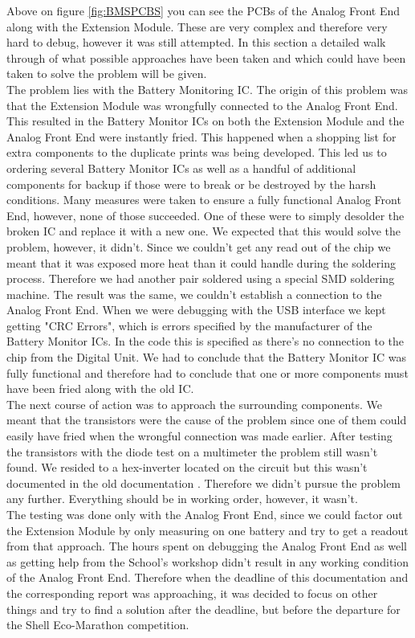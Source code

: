 Above on figure \vref{fig:BMSPCBS} you can see the PCBs of the Analog Front End along with the Extension Module. These are very complex and therefore very hard to debug, however it was still attempted. In this section a detailed walk through of what possible approaches have been taken and which could have been taken to solve the problem will be given. \\
The problem lies with the Battery Monitoring IC. The origin of this problem was that the Extension Module was wrongfully connected to the Analog Front End. This resulted in the Battery Monitor ICs on both the Extension Module and the Analog Front End were instantly fried. This happened when a shopping list for extra components to the duplicate prints was being developed. This led us to ordering several Battery Monitor ICs as well as a handful of additional components for backup if those were to break or be destroyed by the harsh conditions. Many measures were taken to ensure a fully functional Analog Front End, however, none of those succeeded. One of these were to simply desolder the broken IC and replace it with a new one. We expected that this would solve the problem, however, it didn't. Since we couldn't get any read out of the chip we meant that it was exposed more heat than it could handle during the soldering process. Therefore we had another pair soldered using a special SMD soldering machine. The result was the same, we couldn't establish a connection to the Analog Front End. When we were debugging with the USB interface we kept getting "CRC Errors", which is errors specified by the manufacturer of the Battery Monitor ICs. In the code this is specified as there's no connection to the chip from the Digital Unit. We had to conclude that the Battery Monitor IC was fully functional and therefore had to conclude that one or more components must have been fried along with the old IC. \\
The next course of action was to approach the surrounding components. We meant that the transistors were the cause of the problem since one of them could easily have fried when the wrongful connection was made earlier. After testing the transistors with the diode test on a multimeter the problem still wasn't found. We resided to a hex-inverter located on the circuit but this wasn't documented in the old documentation \cite{BMSDocumentation}. Therefore we didn't pursue the problem any further. Everything should be in working order, however, it wasn't.\\
The testing was done only with the Analog Front End, since we could factor out the Extension Module by only measuring on one battery and try to get a readout from that approach. The hours spent on debugging the Analog Front End as well as getting help from the School's workshop didn't result in any working condition of the Analog Front End. Therefore when the deadline of this documentation and the corresponding report was approaching, it was decided to focus on other things and try to find a solution after the deadline, but before the departure for the Shell Eco-Marathon competition.

